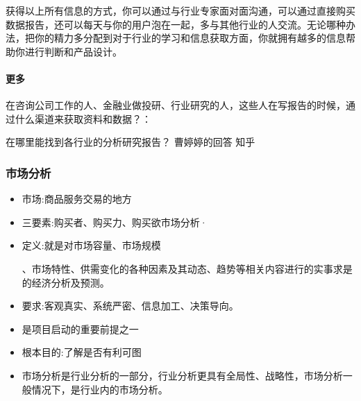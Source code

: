 \documentclass[letterpaper,10pt,english]{sphinxmanual}
\begin{document}
获得以上所有信息的方式，你可以通过与行业专家面对面沟通，可以通过直接购买数据报告，还可以每天与你的用户泡在一起，多与其他行业的人交流。无论哪种办法，把你的精力多分配到对于行业的学习和信息获取方面，你就拥有越多的信息帮助你进行判断和产品设计。


\paragraph{更多}
\label{\detokenize{chapter_knowledge/industry_analysis:id26}}
在咨询公司工作的人、金融业做投研、行业研究的人，这些人在写报告的时候，通过什么渠道来获取资料和数据？：

在哪里能找到各行业的分析研究报告？ \sphinxhyphen{} 曹婷婷的回答 \sphinxhyphen{} 知乎


\subsubsection{市场分析}
\label{\detokenize{chapter_knowledge/market_analysis:market-analysis}}\label{\detokenize{chapter_knowledge/market_analysis:id1}}\label{\detokenize{chapter_knowledge/market_analysis::doc}}\begin{itemize}
\item {} 
市场:商品服务交易的地方

\item {} 
三要素:购买者、购买力、购买欲市场分析·

\item {} 
定义:就是对市场容量、市场规模%
\begin{footnote}[515]\sphinxAtStartFootnote
{}
%
\end{footnote}、市场特性、供需变化的各种因素及其动态、趋势等相关内容进行的实事求是的经济分析及预测。

\item {} 
要求:客观真实、系统严密、信息加工、决策导向。

\item {} 
是项目启动的重要前提之一

\item {} 
根本目的:了解是否有利可图%
\begin{footnote}[516]\sphinxAtStartFootnote
{}
%
\end{footnote}

\item {} 
市场分析是行业分析的一部分，行业分析更具有全局性、战略性，市场分析一般情况下，是行业内的市场分析。

\end{itemize}
\end{document}
